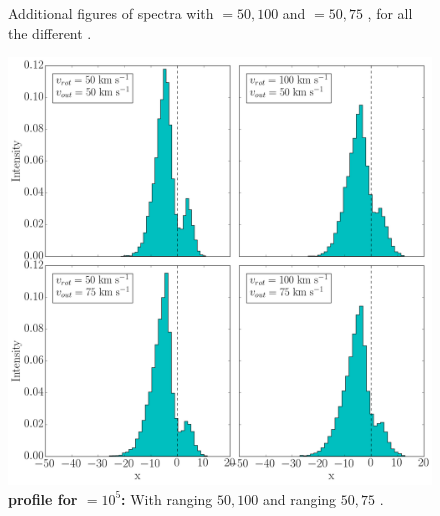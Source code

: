 \documentclass[twocolappendix]{latex/emulateapj}
\begin{document}
\begin{figure}[!htbp]
\begin{minipage}[b]{0.45\textwidth}
		Additional figures of spectra with \vrot $= 50,100$ \kms and \vout $= 50,75$ \kms, for all the different \tauh. 
		
		\vspace{2.7cm}
		
		\includegraphics[width=\textwidth]{./figures/appendix/2_tau10E5_phi83-90}
		\caption{\textbf{\lya profile for \tauh$=10^5$:} With \vrot ranging $50,100$ \kms and \vout ranging $50,75$ \kms.
			\label{fig:2_tau10E5_phi83-90}}
	\end{minipage}
\end{figure}
\end{document}
